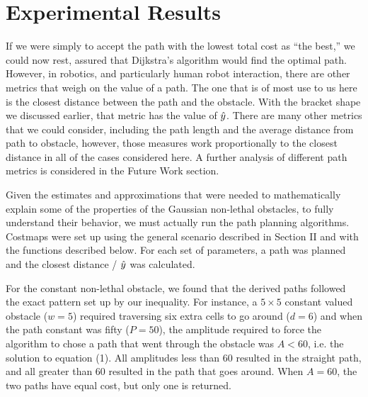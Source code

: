 \section{Experimental Results}


If we were simply to accept the path with the lowest total cost as ``the best,'' we could now rest, assured that Dijkstra's algorithm would find the optimal path. However, in robotics, and particularly human robot interaction, there are other metrics that weigh on the value of a path. The one that is of most use to us here is the closest distance between the path and the obstacle. With the bracket shape we discussed earlier, that metric has the value of $\hat{y}$. There are many other metrics that we could consider, including the path length and the average distance from path to obstacle, however, those measures work proportionally to the closest distance in all of the cases considered here. A further analysis of different path metrics is considered in the Future Work section. 

Given the estimates and approximations that were needed to mathematically explain some of the properties of the Gaussian non-lethal obstacles, to fully understand their behavior, we must actually run the path planning algorithms. Costmaps were set up using the general scenario described in Section II and with the functions described below. For each set of parameters, a path was planned and the closest distance / $\hat{y}$ was calculated. 

For the constant non-lethal obstacle, we found that the derived paths followed the exact pattern set up by our inequality. For instance, a $5\times5$ constant valued obstacle ($w=5$) required traversing six extra cells to go around ($d=6$) and when the path constant was fifty ($P=50$), the amplitude required to force the algorithm to chose a path that went through the obstacle was $A<60$, i.e. the solution to equation (1). All amplitudes less than 60 resulted in the straight path, and all greater than 60 resulted in the path that goes around. When $A=60$, the two paths have equal cost, but only one  is returned.

